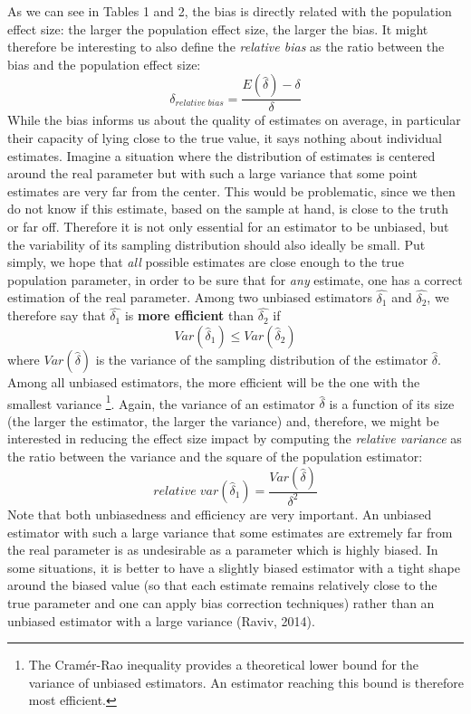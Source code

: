 \documentclass[
  english,
  man,floatsintext]{apa6}
\begin{document}
As we can see in Tables 1 and 2, the bias is directly related with the population effect size: the larger the population effect size, the larger the bias. It might therefore be interesting to also define the \emph{relative bias} as the ratio between the bias and the population effect size:
\begin{equation} 
\delta_{relative \; bias}=\frac{E(\hat{\delta})-\delta}{\delta}
\label{eq:RELBIAS} 
\end{equation}
While the bias informs us about the quality of estimates on average, in particular their capacity of lying close to the true value, it says nothing about individual estimates. Imagine a situation where the distribution of estimates is centered around the real parameter but with such a large variance that some point estimates are very far from the center. This would be problematic, since we then do not know if this estimate, based on the sample at hand, is close to the truth or far off. Therefore it is not only essential for an estimator to be unbiased, but the variability of its sampling distribution should also ideally be small. Put simply, we hope that \emph{all} possible estimates are close enough to the true population parameter, in order to be sure that for \emph{any} estimate, one has a correct estimation of the real parameter. Among two unbiased estimators \(\hat{\delta_1}\) and \(\hat{\delta_2}\), we therefore say that \(\hat{\delta_1}\) is \textbf{more efficient} than \(\hat{\delta_2}\) if
\begin{equation} 
Var(\hat{\delta}_1) \leq Var(\hat{\delta}_2)
\label{eq:EFFICIENCY} 
\end{equation}
where \(Var(\hat{\delta})\) is the variance of the sampling distribution of the estimator \(\hat{\delta}\). Among all unbiased estimators, the more efficient will be the one with the smallest variance \footnote{The Cramér-Rao inequality provides a theoretical lower bound for the variance of unbiased estimators. An estimator reaching this bound is therefore most efficient.}. Again, the variance of an estimator \(\hat{\delta}\) is a function of its size (the larger the estimator, the larger the variance) and, therefore, we might be interested in reducing the effect size impact by computing the \emph{relative variance} as the ratio between the variance and the square of the population estimator:
\begin{equation} 
relative \; var(\hat{\delta}_1)=\frac{Var(\hat{\delta})}{\delta^2}
\label{eq:RELVAR} 
\end{equation}
Note that both unbiasedness and efficiency are very important. An unbiased estimator with such a large variance that some estimates are extremely far from the real parameter is as undesirable as a parameter which is highly biased. In some situations, it is better to have a slightly biased estimator with a tight shape around the biased value (so that each estimate remains relatively close to the true parameter and one can apply bias correction techniques) rather than an unbiased estimator with a large variance (Raviv, 2014).
\end{document}

